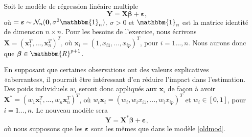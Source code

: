 \begin{questions}
\vspace{1cm}

\question 
Soit le modèle de régression linéaire multiple 
\begin{equation}\label{oldmod}
    \boldsymbol{Y}=\boldsymbol{X\beta}+\boldsymbol{\varepsilon},
\end{equation}
où $=\boldsymbol{\varepsilon}\sim\mathcal{N}_n(\boldsymbol{0},\sigma^2 \mathbbm{1}_n)$, $\sigma>0$ et $\mathbbm{1}_n$ est la
matrice identité de dimension $n\times n$. 
Pour les besoins de l'exercice, nous écrivons $\boldsymbol{X}=(\boldsymbol{x}_1^T,\hdots,\boldsymbol{x}_n^T)^T$, où $\boldsymbol{x}_i=(1, x_{i1},\hdots, x_{ip})^T$, pour $i=1\hdots,n$. 
Nous aurons donc que $\boldsymbol{\beta}\in \mathbbm{R}^{p+1}$.

En supposant que certaines observations ont des valeurs explicatives «aberrantes», il pourrait être intéressant d'en réduire l'impact dans l'estimation.
Des poids individuels $w_i$ seront donc appliqués aux $\boldsymbol{x}_i$ de façon à avoir $\boldsymbol{X}^*=(w_1\boldsymbol{x}_1^T,\hdots,w_n\boldsymbol{x}_n^T)^T$, où $w_i\boldsymbol{x}_i=(w_i, w_ix_{i1},\hdots, w_ix_{ip})^T$ et $w_i \in [0,1]$, pour $i=1\hdots,n$.  
Le nouveau modèle sera 
\begin{equation}\label{newmod}
    \boldsymbol{Y}=\boldsymbol{X}^* \boldsymbol{\beta}+\boldsymbol{\varepsilon},
\end{equation}
où nous supposons que les $\boldsymbol{\varepsilon}$ sont les mêmes que dans le modèle \eqref{oldmod}.
\end{questions}
